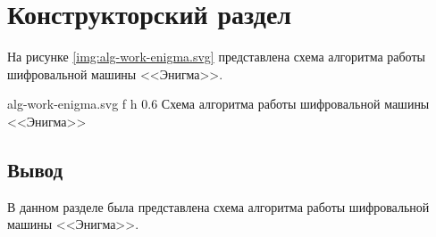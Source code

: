 \chapter{Конструкторский раздел}

На рисунке \ref{img:alg-work-enigma.svg} представлена схема алгоритма работы шифровальной машины <<Энигма>>.

{alg-work-enigma.svg} %
{f} %
{h} %
{0.6\textwidth} %
{Схема алгоритма работы шифровальной машины <<Энигма>>} %

\section*{Вывод}

В данном разделе была представлена схема алгоритма работы шифровальной машины <<Энигма>>.




